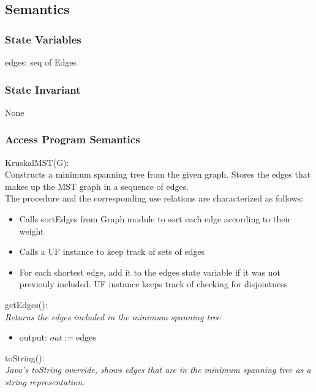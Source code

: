 \documentclass[12pt]{article}
\begin{document}
\subsection* {Semantics}

\subsubsection* {State Variables}

edges: seq of Edges

\subsubsection* {State Invariant}

None

\subsubsection* {Access Program Semantics}

KruskalMST(G):\\
Constructs a minimum spanning tree from the given graph. Stores the edges
that makes up the MST graph in a sequence of edges.\\
\noindent
The procedure and the corresponding use relations are characterized as follows:
\begin{itemize}
\item Calls sortEdges from Graph module to sort each edge according to their weight
\item Calls a UF instance to keep track of sets of edges
\item For each shortest edge, add it to the edges state variable if it was not
previouly included. UF instance keeps track of checking for disjointness
\end{itemize}

\noindent
getEdges():\\
\textit{Returns the edges included in the minimum spanning tree}
\begin{itemize}
\item output: $out := \mbox{edges}$
\end{itemize}

\noindent
toString():\\
\textit{Java's toString override, shows edges that are in the minimum spanning tree
as a string representation.}

\newpage

\end{document}
